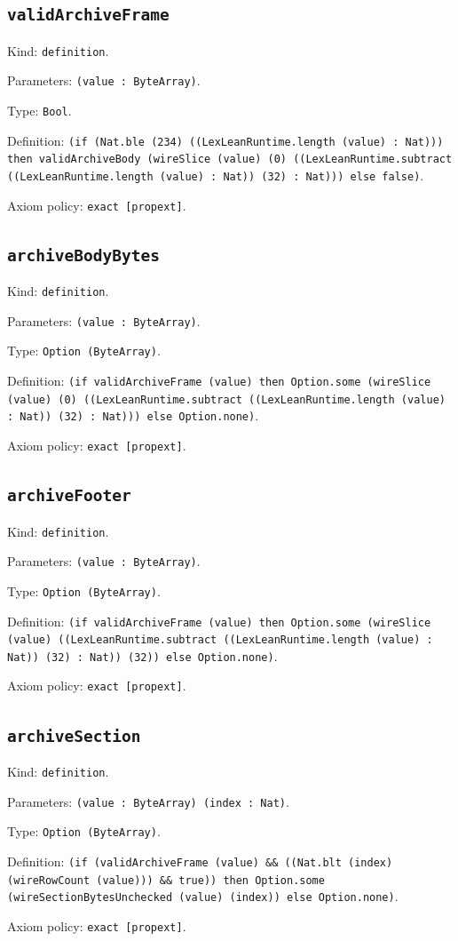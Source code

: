 \documentclass[11pt]{article}
\begin{document}
\subsection*{\texttt{validArchiveFrame}}
\noindent Kind: \texttt{definition}.\par
\noindent Parameters: \texttt{(value : ByteArray)}.\par
\noindent Type: \texttt{Bool}.\par
\noindent Definition: \texttt{(if (Nat.ble (234) ((LexLeanRuntime.length (value) : Nat))) then validArchiveBody (wireSlice (value) (0) ((LexLeanRuntime.subtract ((LexLeanRuntime.length (value) : Nat)) (32) : Nat))) else false)}.\par
\noindent Axiom policy: \texttt{exact [propext]}.\par
\subsection*{\texttt{archiveBodyBytes}}
\noindent Kind: \texttt{definition}.\par
\noindent Parameters: \texttt{(value : ByteArray)}.\par
\noindent Type: \texttt{Option (ByteArray)}.\par
\noindent Definition: \texttt{(if validArchiveFrame (value) then Option.some (wireSlice (value) (0) ((LexLeanRuntime.subtract ((LexLeanRuntime.length (value) : Nat)) (32) : Nat))) else Option.none)}.\par
\noindent Axiom policy: \texttt{exact [propext]}.\par
\subsection*{\texttt{archiveFooter}}
\noindent Kind: \texttt{definition}.\par
\noindent Parameters: \texttt{(value : ByteArray)}.\par
\noindent Type: \texttt{Option (ByteArray)}.\par
\noindent Definition: \texttt{(if validArchiveFrame (value) then Option.some (wireSlice (value) ((LexLeanRuntime.subtract ((LexLeanRuntime.length (value) : Nat)) (32) : Nat)) (32)) else Option.none)}.\par
\noindent Axiom policy: \texttt{exact [propext]}.\par
\subsection*{\texttt{archiveSection}}
\noindent Kind: \texttt{definition}.\par
\noindent Parameters: \texttt{(value : ByteArray) (index : Nat)}.\par
\noindent Type: \texttt{Option (ByteArray)}.\par
\noindent Definition: \texttt{(if (validArchiveFrame (value) \&\& ((Nat.blt (index) (wireRowCount (value))) \&\& true)) then Option.some (wireSectionBytesUnchecked (value) (index)) else Option.none)}.\par
\noindent Axiom policy: \texttt{exact [propext]}.\par
\end{document}
